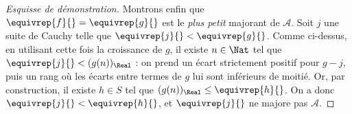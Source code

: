 \documentclass[../../../include/open-logic-section]{subfiles}
\begin{document}
\begin{proof}[Esquisse de démonstration]
Montrons enfin que $\equivrep{f}{}=\equivrep{g}{}$ est le
\emph{plus petit} majorant de $\mathcal A$. Soit $j$ une suite de
Cauchy telle que $\equivrep{j}{}<\equivrep{g}{}$.
Comme ci-dessus, en utilisant cette fois la croissance de $g$,
il existe $n\in\Nat$ tel que $\equivrep{j}{}<(g(n))_\Real$ :
on prend un écart strictement positif pour $g-j$, puis un rang
où les écarts entre termes de $g$ lui sont inférieurs de moitié.
Or, par construction, il existe $h\in S$ tel que
$(g(n))_\Real\leq\equivrep{h}{}$. On a donc
$\equivrep{j}{}<\equivrep{h}{}$, et $\equivrep{j}{}$ ne majore pas
$\mathcal A$.
\end{proof}
\end{document}
